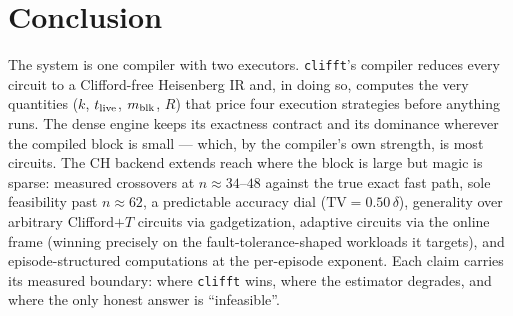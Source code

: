 \documentclass[11pt]{article}
\begin{document}
\section{Conclusion}
The system is one compiler with two executors. \texttt{clifft}'s compiler
reduces every circuit to a Clifford-free Heisenberg IR and, in doing so,
computes the very quantities ($k$, $t_{\rm live}$, $m_{\rm blk}$, $R$) that
price four execution strategies before anything runs. The dense engine keeps
its exactness contract and its dominance wherever the compiled block is
small --- which, by the compiler's own strength, is most circuits. The
CH backend extends reach where the block is large but magic is sparse:
measured crossovers at $n\!\approx\!34$--$48$ against the true exact fast
path, sole feasibility past $n\!\approx\!62$, a predictable accuracy dial
($\mathrm{TV}=0.50\,\delta$), generality over arbitrary Clifford$+T$
circuits via gadgetization, adaptive circuits via the online frame (winning
precisely on the fault-tolerance-shaped workloads it targets), and
episode-structured computations at the per-episode exponent. Each claim
carries its measured boundary: where \texttt{clifft} wins, where the
estimator degrades, and where the only honest answer is ``infeasible''.
\end{document}
